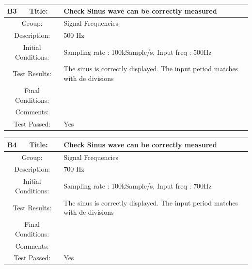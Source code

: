 \documentclass[12pt]{article}
\begin{document}
	\begin{table}[H]
	\begin{center}
		\begin{tabular}{| m{2cm}|m{2cm}|m{12cm}|}
			\hline 
			\bf B3&\bf Title:&\bf Check Sinus wave can be correctly measured\\ 
			\hline 
			\multicolumn{2}{|c|}{Group:}&Signal Frequencies\\ 
			\hline 
			\multicolumn{2}{|c|}{Description:}&500 Hz\\ 
			\hline 
			\multicolumn{2}{|c|}{Initial Conditions:}&Sampling rate : 100kSample/s, Input freq : 500Hz\\ 
			\hline 
			\multicolumn{2}{|c|}{Test Results:}&The sinus is correctly displayed. The input period matches with de divisions\\ 
			\hline 
			\multicolumn{2}{|c|}{Final Conditions:}&\\ 
			\hline 
			\multicolumn{2}{|c|}{Comments:}&\\ 
			\hline 
			\multicolumn{2}{|c|}{Test Passed:}&Yes \\ 
			\hline 
		\end{tabular} 
	\end{center}
\end{table}	
	\begin{table}[H]
	\begin{center}
		\begin{tabular}{| m{2cm}|m{2cm}|m{12cm}|}
			\hline 
			\bf B4&\bf Title:&\bf Check Sinus wave can be correctly measured\\ 
			\hline 
			\multicolumn{2}{|c|}{Group:}&Signal Frequencies\\ 
			\hline 
			\multicolumn{2}{|c|}{Description:}&700 Hz\\ 
			\hline 
			\multicolumn{2}{|c|}{Initial Conditions:}&Sampling rate : 100kSample/s, Input freq : 700Hz\\ 
			\hline 
			\multicolumn{2}{|c|}{Test Results:}&The sinus is correctly displayed. The input period matches with de divisions\\ 
			\hline 
			\multicolumn{2}{|c|}{Final Conditions:}&\\ 
			\hline 
			\multicolumn{2}{|c|}{Comments:}&\\ 
			\hline 
			\multicolumn{2}{|c|}{Test Passed:}&Yes \\ 
			\hline 
		\end{tabular} 
	\end{center}
\end{table}	
	
\end{document}
